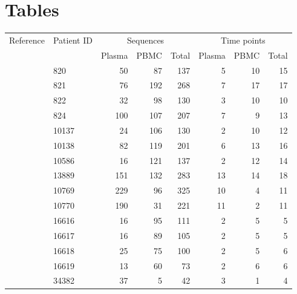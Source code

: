 \documentclass[12pt]{article}
\begin{document}
\clearpage


\section * {Tables}

\begin{table}[!ht]
\def\arraystretch{1.3}%
\begin{center}
\begin{tabular}{llrrrrrr} 

Reference & Patient ID & \multicolumn{3}{c}{Sequences} & \multicolumn{3}{c}{Time points}\\ 
 &  & Plasma & PBMC & Total & Plasma & PBMC & Total\\
\hline
\cite{Shankarappa99} & 820 &       50 &       87 &      137 &        5 &       10 &       15  \\
& 821 &      76 &      192 &      268 &        7 &       17 &       17   \\ 
& 822 &      32 &       98 &      130 &        3 &       10 &       10   \\ 
& 824 &     100 &      107 &      207 &        7 &        9 &       13   \\ 
& 10137 &     24 &      106 &      130 &        2 &       10 &       12  \\ 
& 10138 &     82 &      119 &      201 &        6 &       13 &       16  \\
& 10586 &     16 &      121 &      137 &        2 &       12 &       14  \\ 
& 13889 &    151 &      132 &      283 &       13 &       14 &       18  \\ 
 \cite{Fischer04} & 10769 &    229 &       96 &      325 &       10 &        4 &       11  \\ 
& 10770 &    190 &       31 &      221 &       11 &        2 &       11  \\ 
\cite{Llewellyn06} & 16616 &     16 &       95 &      111 &        2 &        5 &        5  \\ 
& 16617 &     16 &       89 &      105 &        2 &        5 &        5  \\ 
& 16618 &     25 &       75 &      100 &        2 &        5 &        6  \\ 
& 16619 &     13 &       60 &       73 &        2 &        6 &        6  \\ 
\cite{Novitsky09} & 34382 &     37 &        5 &       42 &        3 &        1 &        4  \\ 

\end{tabular}
\end{center}
\end{table}
\end{document}
